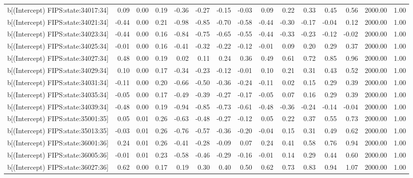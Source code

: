 \begin{table}[ht]
\begin{tabular}{rrrrrrrrrrrrrrr}
  b[(Intercept) FIPS:state:34017:34] & 0.09 & 0.00 & 0.19 & -0.36 & -0.27 & -0.15 & -0.03 & 0.09 & 0.22 & 0.33 & 0.45 & 0.56 & 2000.00 & 1.00 \\ 
  b[(Intercept) FIPS:state:34021:34] & -0.44 & 0.00 & 0.21 & -0.98 & -0.85 & -0.70 & -0.58 & -0.44 & -0.30 & -0.17 & -0.04 & 0.12 & 2000.00 & 1.00 \\ 
  b[(Intercept) FIPS:state:34023:34] & -0.44 & 0.00 & 0.16 & -0.84 & -0.75 & -0.65 & -0.55 & -0.44 & -0.33 & -0.23 & -0.12 & -0.02 & 2000.00 & 1.00 \\ 
  b[(Intercept) FIPS:state:34025:34] & -0.01 & 0.00 & 0.16 & -0.41 & -0.32 & -0.22 & -0.12 & -0.01 & 0.09 & 0.20 & 0.29 & 0.37 & 2000.00 & 1.00 \\ 
  b[(Intercept) FIPS:state:34027:34] & 0.48 & 0.00 & 0.19 & 0.02 & 0.11 & 0.24 & 0.36 & 0.49 & 0.61 & 0.72 & 0.85 & 0.96 & 2000.00 & 1.00 \\ 
  b[(Intercept) FIPS:state:34029:34] & 0.10 & 0.00 & 0.17 & -0.34 & -0.23 & -0.12 & -0.01 & 0.10 & 0.21 & 0.31 & 0.43 & 0.52 & 2000.00 & 1.00 \\ 
  b[(Intercept) FIPS:state:34031:34] & -0.11 & 0.00 & 0.20 & -0.66 & -0.50 & -0.36 & -0.24 & -0.11 & 0.02 & 0.15 & 0.29 & 0.39 & 2000.00 & 1.00 \\ 
  b[(Intercept) FIPS:state:34035:34] & -0.05 & 0.00 & 0.17 & -0.49 & -0.39 & -0.27 & -0.17 & -0.05 & 0.07 & 0.16 & 0.29 & 0.39 & 2000.00 & 1.00 \\ 
  b[(Intercept) FIPS:state:34039:34] & -0.48 & 0.00 & 0.19 & -0.94 & -0.85 & -0.73 & -0.61 & -0.48 & -0.36 & -0.24 & -0.14 & -0.04 & 2000.00 & 1.00 \\ 
  b[(Intercept) FIPS:state:35001:35] & 0.05 & 0.01 & 0.26 & -0.63 & -0.48 & -0.27 & -0.12 & 0.05 & 0.22 & 0.37 & 0.55 & 0.73 & 2000.00 & 1.00 \\ 
  b[(Intercept) FIPS:state:35013:35] & -0.03 & 0.01 & 0.26 & -0.76 & -0.57 & -0.36 & -0.20 & -0.04 & 0.15 & 0.31 & 0.49 & 0.62 & 2000.00 & 1.00 \\ 
  b[(Intercept) FIPS:state:36001:36] & 0.24 & 0.01 & 0.26 & -0.41 & -0.28 & -0.09 & 0.07 & 0.24 & 0.41 & 0.58 & 0.76 & 0.94 & 2000.00 & 1.00 \\ 
  b[(Intercept) FIPS:state:36005:36] & -0.01 & 0.01 & 0.23 & -0.58 & -0.46 & -0.29 & -0.16 & -0.01 & 0.14 & 0.29 & 0.44 & 0.60 & 2000.00 & 1.00 \\ 
  b[(Intercept) FIPS:state:36027:36] & 0.62 & 0.00 & 0.17 & 0.19 & 0.30 & 0.40 & 0.50 & 0.62 & 0.73 & 0.83 & 0.94 & 1.07 & 2000.00 & 1.00 \\ 

\end{tabular}
\end{table}
